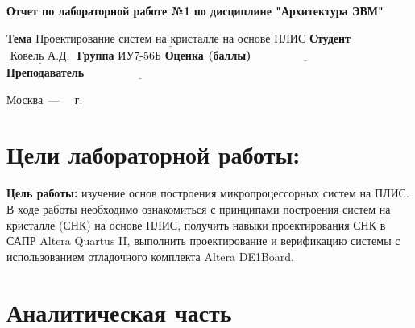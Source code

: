 \documentclass[12pt]{report}
\begin{document}
\begin{titlepage}
	
	\begin{center}
		\noindent\begin{minipage}{1.3\textwidth}\centering
			\Large\textbf{Отчет по лабораторной работе №1}\newline
			\textbf{по дисциплине "Архитектура ЭВМ"}\newline\newline
		\end{minipage}
	\end{center}
	
	\noindent\textbf{Тема} $\underline{\text{Проектирование систем на кристалле на основе ПЛИС}}$\newline\newline
	\noindent\textbf{Студент} $\underline{\text{ Ковель А.Д. }}$\newline\newline
	\noindent\textbf{Группа} $\underline{\text{ИУ7-56Б}}$\newline\newline
	\noindent\textbf{Оценка (баллы)} $\underline{\text{~~~~~~~~~~~~~~~~~~~~~~~~~~~}}$\newline\newline
	\noindent\textbf{Преподаватель} $\underline{\text{~~~~~~~~~~~~~~~~~~~~~~~~~~~ }}$\newline\newline\newline
	
	\begin{center}
		\vfill
		Москва~---~\the\year
		~г.
	\end{center}
\end{titlepage}


\tableofcontents

\newpage
\chapter{Цели лабораторной работы: }
\textbf{Цель работы:} изучение основ построения микропроцессорных систем на ПЛИС. В ходе работы необходимо ознакомиться с принципами построения систем на кристалле (СНК) на основе ПЛИС, получить навыки проектирования СНК в САПР Altera Quartus II, выполнить проектирование и верификацию системы с использованием отладочного комплекта Altera DE1Board.
	
\clearpage

\chapter{Аналитическая часть}
\end{document}
